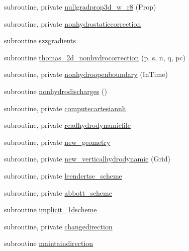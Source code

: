 \begin{DoxyCompactItemize}
\item 
subroutine, private \mbox{\hyperlink{namespacemodulehydrodynamic_a13ad3cb0f06fa1566caea1eedccae55a}{nullgradprop3d\+\_\+w\+\_\+r8}} (Prop)
\item 
subroutine, private \mbox{\hyperlink{namespacemodulehydrodynamic_abc8e7cbc6bd77b58f41b41db117c979b}{nonhydrostaticcorrection}}
\item 
subroutine \mbox{\hyperlink{namespacemodulehydrodynamic_a38e7a7184b963c8e5a55ddb911180c72}{szzgradients}}
\item 
subroutine \mbox{\hyperlink{namespacemodulehydrodynamic_ae703b0f1de9b2461040ee74aa6867ff7}{thomas\+\_\+2d\+\_\+nonhydrocorrection}} (p, s, n, q, pc)
\item 
subroutine, private \mbox{\hyperlink{namespacemodulehydrodynamic_aa8e7eaaf3d7106144fb138675637be7e}{nonhydroopenboundary}} (In\+Time)
\item 
subroutine \mbox{\hyperlink{namespacemodulehydrodynamic_a5a21356710281101f911022fe04dd47d}{nonhydrodischarges}} ()
\item 
subroutine, private \mbox{\hyperlink{namespacemodulehydrodynamic_a40e6066d8e63726036522b3dcddee56a}{computecartesiannh}}
\item 
subroutine, private \mbox{\hyperlink{namespacemodulehydrodynamic_a2b422929c9c1ce1f75858893e788082f}{readhydrodynamicfile}}
\item 
subroutine, private \mbox{\hyperlink{namespacemodulehydrodynamic_a348f4fbd3311ec9fc2bcc611faaa34be}{new\+\_\+geometry}}
\item 
subroutine, private \mbox{\hyperlink{namespacemodulehydrodynamic_a9865dafdd7098ab67142ed4fe05d5548}{new\+\_\+verticalhydrodynamic}} (Grid)
\item 
subroutine, private \mbox{\hyperlink{namespacemodulehydrodynamic_a8ca7371a9688becd96976013be92880a}{leendertse\+\_\+scheme}}
\item 
subroutine, private \mbox{\hyperlink{namespacemodulehydrodynamic_ab24f3a1aadd0e5ea548005ab690517a5}{abbott\+\_\+scheme}}
\item 
subroutine \mbox{\hyperlink{namespacemodulehydrodynamic_aad271ff300fe974ab4d13ed6f1bd315d}{implicit\+\_\+1dscheme}}
\item 
subroutine, private \mbox{\hyperlink{namespacemodulehydrodynamic_a21da40cf926fb3d12ccc40743a115da6}{changedirection}}
\item 
subroutine \mbox{\hyperlink{namespacemodulehydrodynamic_a178f5e060ebc6d1ddcb0e70a9c9e95c2}{maintaindirection}}
\item 

\end{DoxyCompactItemize}
